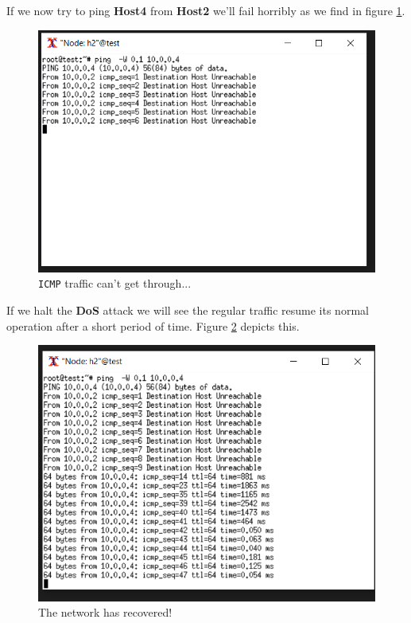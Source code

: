 \documentclass[12pt]{article}
\newcommand{\newpar} {
    \vskip 1cm
}
\begin{document}
        \newpage		
		If we now try to ping \textbf{Host4} from \textbf{Host2} we'll fail horribly as we find in figure \ref{f:net_down}.

		\begin{figure}[!htb]
			\centering
			\includegraphics[width=\linewidth]{net_down.png}
			\caption{\texttt{ICMP} traffic can't get through...}
			\label{f:net_down}
		\end{figure}

		If we halt the \textbf{DoS} attack we will see the regular traffic resume its normal operation after a short period of time. Figure \ref{f:net_ok} depicts this.
		\newpar

		\begin{figure}[!htb]
			\centering
			\includegraphics[width=\linewidth]{net_ok.png}
			\caption{The network has recovered!}
			\label{f:net_ok}
		\end{figure}
\end{document}
